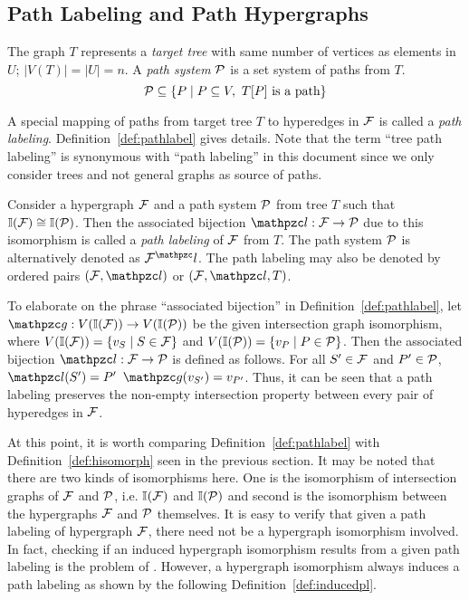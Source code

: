 \subsection{Path Labeling and Path Hypergraphs}
\label{sec:pathhypergraph}
The graph $T$ represents a {\em target tree} with same number of
vertices as elements in $U$; $|V(T)|=|U|=n$.  A {\em path system}
${\cal P}$ is a set system of paths from $T$. 
\[{\cal P} \subseteq \{P \mid P \subseteq V, \text{ } T[P] \text{ is a
  path} \}\] 

A special mapping of paths from target tree $T$ to hyperedges in ${\cal F}$
is called a {\em path labeling}. Definition~\ref{def:pathlabel} gives
details. Note that the term ``tree path labeling'' is synonymous
with ``path labeling'' in this document since we only consider trees and
not general graphs as source of paths.

\begin{definition}
  \label{def:pathlabel}
  Consider a hypergraph ${\cal F}$ %
  and a path system ${\cal P}$ from tree $T$ such that $\mathbb I({\cal F}) \cong
  \mathbb I({\cal P})$.  Then the associated bijection $\cl: \cF
  \rightarrow \cP$ due to this isomorphism is called a {\em path
    labeling} of ${\cal F}$ from $T$. The path system ${\cal P}$ is
  alternatively denoted as $\cF^\cl$. The path labeling may also be
  denoted by ordered pairs $(\cF,\cl)$ or $(\cF,\cl,T)$.
\end{definition}
To elaborate on the phrase ``associated bijection'' in
Definition~\ref{def:pathlabel}, let $\cg: V(\bI(\cF)) \rightarrow
V(\bI(\cP))$ be the given intersection graph isomorphism, where
$V(\mathbb I({\cal F})) = \{ v_S \mid S \in {\cal F}\}$ and $V(\mathbb I({\cal P})) = \{v_P \mid
P \in {\cal P}\}$. Then the associated bijection $\cl: \cF \rightarrow \cP$
is defined as follows. For all $S' \in {\cal F}$ and $P' \in {\cal P}$, $\cl(S')
= P'$ \iff $\cg(v_{S'}) = v_{P'}$.  Thus, it can be seen that a path
labeling preserves the non-empty intersection property between every
pair of hyperedges in ${\cal F}$.

At this point, it is worth comparing Definition~\ref{def:pathlabel}
with Definition~\ref{def:hisomorph} seen in the previous section.  It
may be noted that there are two kinds of isomorphisms here. One is the
isomorphism of intersection graphs of ${\cal F}$ and ${\cal P}$, i.e. $\mathbb I({\cal F})$
and $\mathbb I({\cal P})$ and second is the isomorphism between the hypergraphs
${\cal F}$ and ${\cal P}$ themselves. It is easy to verify that given a path
labeling of hypergraph ${\cal F}$, there need not be a hypergraph
isomorphism involved. In fact, checking if an induced hypergraph
isomorphism results from a given path labeling is the problem of
\CFTPL.  However, a hypergraph isomorphism always induces a path
labeling as shown by the following Definition~\ref{def:inducedpl}.  

